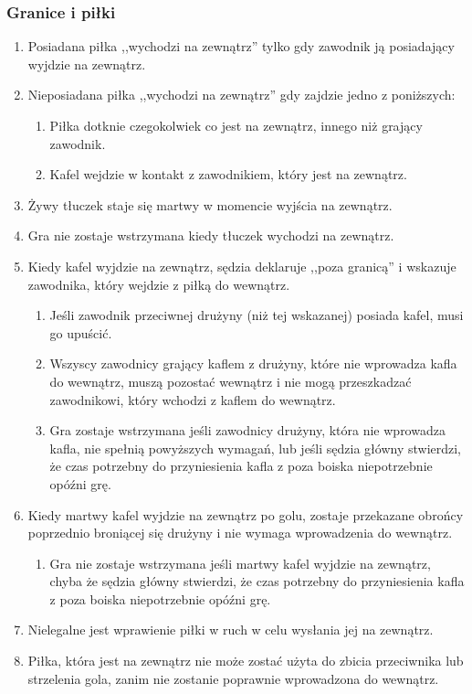 \documentclass[11pt,a4paper]{article}
\begin{document}
\subsubsection{Granice i piłki}
\begin{enumerate}
  \item Posiadana piłka ,,wychodzi na zewnątrz'' tylko gdy zawodnik ją posiadający wyjdzie na zewnątrz.
  \item Nieposiadana piłka ,,wychodzi na zewnątrz'' gdy zajdzie jedno z poniższych:
  \begin{enumerate}
    \item Piłka dotknie czegokolwiek co jest na zewnątrz, innego niż grający zawodnik.
    \item Kafel wejdzie w kontakt z zawodnikiem, który jest na zewnątrz.
  \end{enumerate}
  \item Żywy tłuczek staje się martwy w momencie wyjścia na zewnątrz.
  \item Gra nie zostaje wstrzymana kiedy tłuczek wychodzi na zewnątrz.
  \item Kiedy kafel wyjdzie na zewnątrz, sędzia deklaruje ,,poza granicą'' i wskazuje zawodnika, który wejdzie z piłką do wewnątrz.
  \begin{enumerate}
    \item Jeśli zawodnik przeciwnej drużyny (niż tej wskazanej) posiada kafel, musi go upuścić.
    \item Wszyscy zawodnicy grający kaflem z drużyny, które nie wprowadza kafla do wewnątrz, muszą pozostać wewnątrz i nie mogą przeszkadzać zawodnikowi, który wchodzi z kaflem do wewnątrz.
    \item Gra zostaje wstrzymana jeśli zawodnicy drużyny, która nie wprowadza kafla, nie spełnią powyższych wymagań, lub jeśli sędzia główny stwierdzi, że czas potrzebny do przyniesienia kafla z poza boiska niepotrzebnie opóźni grę.
  \end{enumerate}
  \item Kiedy martwy kafel wyjdzie na zewnątrz po golu, zostaje przekazane obrońcy poprzednio broniącej się drużyny i nie wymaga wprowadzenia do wewnątrz.
  \begin{enumerate}
    \item Gra nie zostaje wstrzymana jeśli martwy kafel wyjdzie na zewnątrz, chyba że sędzia główny stwierdzi, że czas potrzebny do przyniesienia kafla z poza boiska niepotrzebnie opóźni grę.
  \end{enumerate}
  \item Nielegalne jest wprawienie piłki w ruch w celu wysłania jej na zewnątrz.
  \item Piłka, która jest na zewnątrz nie może zostać użyta do zbicia przeciwnika lub strzelenia gola, zanim nie zostanie poprawnie wprowadzona do wewnątrz.
\end{enumerate}
\end{document}

